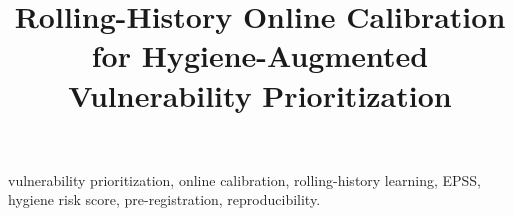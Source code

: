 \documentclass[journal]{IEEEtran}
\title{Rolling-History Online Calibration for Hygiene-Augmented
Vulnerability Prioritization}
\author{%
  \IEEEauthorblockN{Harshavardhan Malla}
  \IEEEauthorblockA{Independent Researcher}%
}
\begin{document}
\maketitle

\begin{abstract}

\end{abstract}

\begin{IEEEkeywords}
vulnerability prioritization, online calibration, rolling-history learning,
EPSS, hygiene risk score, pre-registration, reproducibility.
\end{IEEEkeywords}












\end{document}
